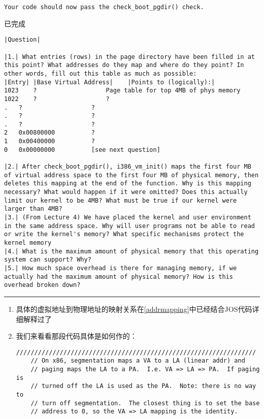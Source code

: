 \documentclass{article}
\begin{document}
\begin{CJK*}{UTF8}{gkai}
\begin{lstlisting}[style=exercise]
Your code should now pass the check_boot_pgdir() check.
\end{lstlisting}
已完成

\vspace{2em}

\begin{lstlisting}[style=exercise]
|Question|

|1.| What entries (rows) in the page directory have been filled in at this point? What addresses do they map and where do they point? In other words, fill out this table as much as possible:
|Entry|	|Base Virtual Address|    |Points to (logically):|
1023	?	                Page table for top 4MB of phys memory
1022	?	                ?
.	?	                ?
.	?	                ?
.	?	                ?
2	0x00800000	        ?
1	0x00400000	        ?
0	0x00000000	        [see next question]

|2.| After check_boot_pgdir(), i386_vm_init() maps the first four MB of virtual address space to the first four MB of physical memory, then deletes this mapping at the end of the function. Why is this mapping necessary? What would happen if it were omitted? Does this actually limit our kernel to be 4MB? What must be true if our kernel were larger than 4MB?
|3.| (From Lecture 4) We have placed the kernel and user environment in the same address space. Why will user programs not be able to read or write the kernel's memory? What specific mechanisms protect the kernel memory
|4.| What is the maximum amount of physical memory that this operating system can support? Why?
|5.| How much space overhead is there for managing memory, if we actually had the maximum amount of physical memory? How is this overhead broken down?
\end{lstlisting}

\vspace{2em}
\hrule
\vspace{2em}

\label{osmemarea}

\begin{enumerate}
\item{具体的虚拟地址到物理地址的映射关系在\ref{addrmapping}中已经结合JOS代码详细解释过了}
\item{我们来看看那段代码具体是如何作的：
\begin{lstlisting}[style=ccode, title={\scriptsize \ttfamily \bfseries kern/pmap.c: i386\_vm\_init ()}]
	//////////////////////////////////////////////////////////////////
	// On x86, segmentation maps a VA to a LA (linear addr) and
	// paging maps the LA to a PA.  I.e. VA => LA => PA.  If paging is
	// turned off the LA is used as the PA.  Note: there is no way to
	// turn off segmentation.  The closest thing is to set the base
	// address to 0, so the VA => LA mapping is the identity.


\end{lstlisting}}
\end{enumerate}
\end{CJK*}
\end{document}

